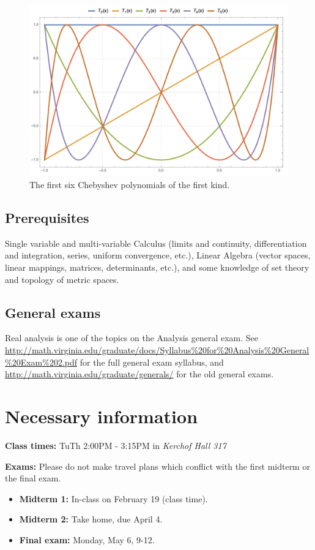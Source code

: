 \documentclass[oneside,11pt]{amsart}
\begin{document}
\begin{figure}[h]
	\includegraphics[height=.5\textwidth]{img/chebyshev.png}
	\caption{The first six Chebyshev polynomials of the first kind.}
\end{figure}

\subsection*{Prerequisites}

Single variable and multi-variable Calculus (limits and continuity,
differentiation and integration, series, uniform convergence, etc.), Linear
Algebra (vector spaces, linear mappings, matrices, determinants, etc.), and
some knowledge of set theory and topology of metric spaces. 

\subsection*{General exams}
Real analysis is one of the topics on the Analysis general exam. 
See \url{http://math.virginia.edu/graduate/docs/Syllabus%20for%20Analysis%20General%20Exam%202.pdf}
for the full general exam syllabus, 
and \url{http://math.virginia.edu/graduate/generals/}
for the old general exams.


\section{Necessary information}
\bigskip

	\textbf{Class times:}   TuTh 2:00PM - 3:15PM in
	\emph{Kerchof Hall 317}

\medskip


\textbf{Exams:} Please do not make travel plans which conflict 
with the first midterm or the final exam.
\begin{itemize}
	\item \textbf{Midterm 1:} In-class on February 19 (class time).
	\item \textbf{Midterm 2:} Take home, due April 4.
	\item \textbf{Final exam:} Monday, May 6, 9-12.
\end{itemize}
\end{document}
